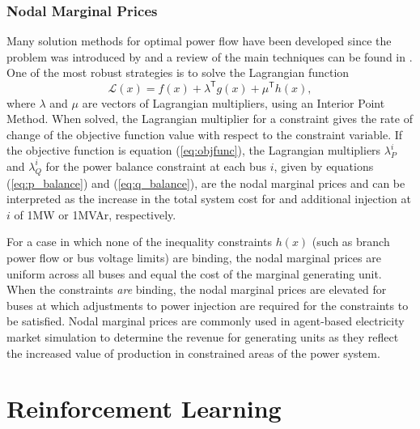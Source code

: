 \subsubsection{Nodal Marginal Prices}
Many solution methods for optimal power flow have been developed
since the problem was introduced by  and a review of the main
techniques can be found in . One of the most
robust strategies is to solve the Lagrangian function
\begin{equation}
\mathcal{L}(x) = f(x) + \lambda^\mathsf{T}g(x) + \mu^\mathsf{T}h(x),
\end{equation}
where $\lambda$ and $\mu$ are vectors of Lagrangian multipliers, using an
Interior Point Method.  When solved, the Lagrangian multiplier for a constraint gives
the rate of change of the objective function value with respect to the
constraint variable.  If the objective function is equation (\ref{eq:objfunc}), the Lagrangian
multipliers $\lambda^i_P$ and $\lambda^i_Q$ for the power balance constraint at
each bus $i$, given by equations (\ref{eq:p_balance}) and (\ref{eq:q_balance}),
are the nodal marginal prices and can be interpreted as the increase in the
total system cost for and additional injection at $i$ of 1MW or 1MVAr,
respectively.

For a case in which none of the inequality constraints $h(x)$
(such as branch power flow or bus voltage limits) are binding, the nodal
marginal prices are uniform across all buses and equal the cost of the
marginal generating unit.  When the constraints \textit{are} binding, the nodal
marginal prices are elevated for buses at which adjustments to power injection
are required for the constraints to be satisfied.  Nodal marginal prices are
commonly used in agent-based electricity market simulation to determine the
revenue for generating units as they reflect the increased value of production in
constrained areas of the power system.

\newpage
\section{Reinforcement Learning}
\label{sec:rl}

